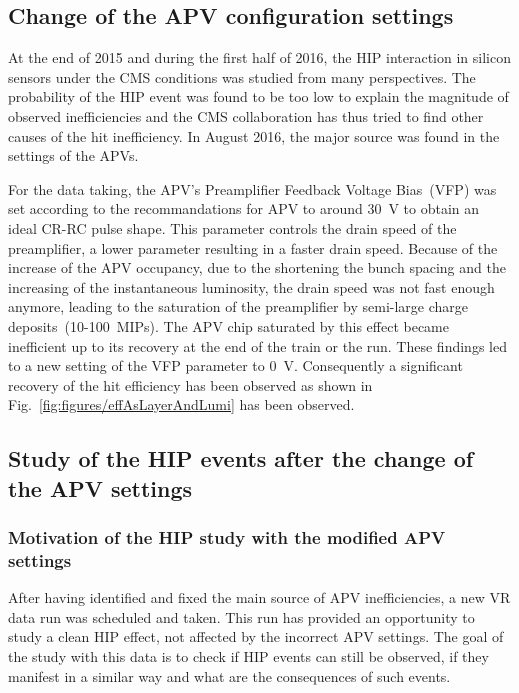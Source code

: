 
\subsection{Change of the APV configuration settings}

At the end of 2015 and during the first half of 2016, the HIP interaction in silicon sensors under the CMS conditions was studied from many perspectives. The probability of the HIP event was found to be too low to explain the magnitude of observed inefficiencies and the CMS collaboration has thus tried to find other causes of the hit inefficiency. In August 2016, the major source was found in the settings of the APVs.

For the data taking, the APV's Preamplifier Feedback Voltage Bias~(VFP) was set according to the recommandations for APV to around 30~V to obtain an ideal CR-RC pulse shape. This parameter controls the drain speed of the preamplifier, a lower parameter resulting in a faster drain speed. Because of the increase of the APV occupancy, due to the shortening the bunch spacing and the increasing of the instantaneous luminosity, the drain speed was not fast enough anymore, leading to the saturation of the preamplifier by semi-large charge deposits~(10-100~MIPs). The APV chip saturated by this effect became inefficient up to its recovery at the end of the train or the run. These findings led to a new setting of the VFP parameter to 0~V. Consequently a significant recovery of the hit efficiency has been observed as shown in Fig.~\ref{fig:figures/effAsLayerAndLumi} has been observed.

\newpage

\subsection{Study of the HIP events after the change of the APV settings~\label{sec:secondStudy}}

\subsubsection{Motivation of the HIP study with the modified APV settings}

After having identified and fixed the main source of APV inefficiencies, a new VR data run was scheduled and taken. This run has provided an opportunity to study a clean HIP effect, not affected by the incorrect APV settings. The goal of the study with this data is to check if HIP events can still be observed, if they manifest in a similar way and what are the consequences of such events.

